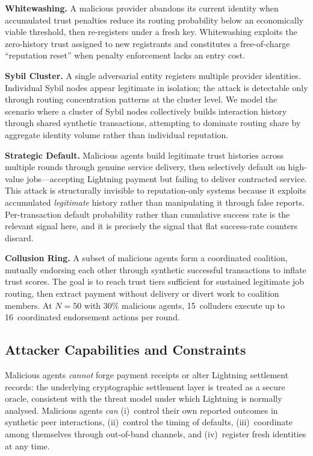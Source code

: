 \documentclass[sigconf,nonacm,10pt]{acmart}
\begin{document}
\noindent\textbf{Whitewashing.}
A malicious provider abandons its current identity when accumulated
trust penalties reduce its routing probability below an
economically viable threshold, then re-registers under a fresh key.
Whitewashing exploits the zero-history trust assigned to new
registrants and constitutes a free-of-charge ``reputation reset''
when penalty enforcement lacks an entry cost.

\noindent\textbf{Sybil Cluster.}
A single adversarial entity registers multiple provider identities.
Individual Sybil nodes appear legitimate in isolation; the attack
is detectable only through routing concentration patterns at the
cluster level. We model the scenario where a cluster of Sybil nodes
collectively builds interaction history through shared synthetic
transactions, attempting to dominate routing share by aggregate
identity volume rather than individual reputation.

\noindent\textbf{Strategic Default.}
Malicious agents build legitimate trust histories across multiple
rounds through genuine service delivery, then selectively default
on high-value jobs---accepting Lightning payment but failing to
deliver contracted service. This attack is structurally invisible
to reputation-only systems because it exploits accumulated
\emph{legitimate} history rather than manipulating it through false
reports. Per-transaction default probability rather than cumulative
success rate is the relevant signal here, and it is precisely the
signal that flat success-rate counters discard.

\noindent\textbf{Collusion Ring.}
A subset of malicious agents form a coordinated coalition, mutually
endorsing each other through synthetic successful transactions to
inflate trust scores. The goal is to reach trust tiers sufficient
for sustained legitimate job routing, then extract payment without
delivery or divert work to coalition members. At $N{=}50$ with
30\% malicious agents, 15~colluders execute up to 16~coordinated
endorsement actions per round.

\subsection{Attacker Capabilities and Constraints}

Malicious agents \emph{cannot} forge payment receipts or alter
Lightning settlement records: the underlying cryptographic
settlement layer is treated as a secure oracle, consistent with
the threat model under which Lightning is normally analysed.
Malicious agents \emph{can} (i)~control their own reported outcomes
in synthetic peer interactions, (ii)~control the timing of defaults,
(iii)~coordinate among themselves through out-of-band channels, and
(iv)~register fresh identities at any time.
\end{document}

